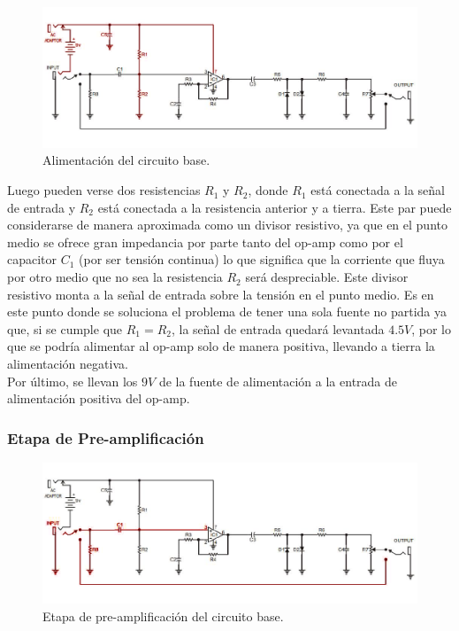 \begin{figure}[H]
	\centering
	\includegraphics[width=1\textwidth, trim={0 0 0 0}, clip]{Ejercicio5/Imagenes/Circuito_base/circuito_base_alimentacion.png}
	\caption{Alimentación del circuito base.}
	\label{fig:circuito_base_alimentacion}
\end{figure}

Luego pueden verse dos resistencias $R_1$ y $R_2$, donde $R_1$ está conectada a la señal de entrada y $R_2$ está conectada a la resistencia anterior y a tierra. Este par puede considerarse de manera aproximada como un divisor resistivo, ya que en el punto medio se ofrece gran impedancia por parte tanto del op-amp como por el capacitor $C_1$ (por ser tensión continua) lo que significa que la corriente que fluya por otro medio que no sea la resistencia $R_2$ será despreciable.
Este divisor resistivo monta a la señal de entrada sobre la tensión en el punto medio. Es en este punto donde se soluciona el problema de tener una sola fuente no partida ya que, si se cumple que $R_1=R_2$, la señal de entrada quedará levantada $4.5V$, por lo que se podría alimentar al op-amp solo de manera positiva, llevando a tierra la alimentación negativa.\\

Por último, se llevan los $9V$ de la fuente de alimentación a la entrada de alimentación positiva del op-amp.


\subsubsection{Etapa de Pre-amplificación}

\begin{figure}[H]
	\centering
	\includegraphics[width=1\textwidth, trim={0 0 0 0}, clip]{Ejercicio5/Imagenes/Circuito_base/circuito_base_preamplificacion.png}
	\caption{Etapa de pre-amplificación del circuito base.}
	\label{fig:circuito_base_preamplificacion}
\end{figure}

